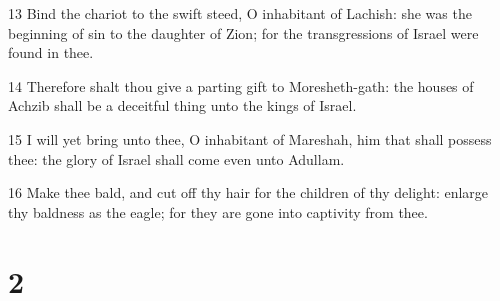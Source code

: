 \par 13 Bind the chariot to the swift steed, O inhabitant of Lachish: she was the beginning of sin to the daughter of Zion; for the transgressions of Israel were found in thee.
\par 14 Therefore shalt thou give a parting gift to Moresheth-gath: the houses of Achzib shall be a deceitful thing unto the kings of Israel.
\par 15 I will yet bring unto thee, O inhabitant of Mareshah, him that shall possess thee: the glory of Israel shall come even unto Adullam.
\par 16 Make thee bald, and cut off thy hair for the children of thy delight: enlarge thy baldness as the eagle; for they are gone into captivity from thee.

\chapter{2}

